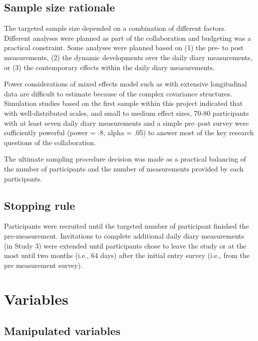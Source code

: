\documentclass[]{article}
\newcounter{question}
\begin{document}
\hypertarget{sample-size-rationale}{%
\subsection{Sample size rationale}\label{sample-size-rationale}}

The targeted sample size depended on a combination of different factors.
Different analyses were planned as part of the collaboration and
budgeting was a practical constraint. Some analyses were planned based
on (1) the pre- to post measurements, (2) the dynamic developments over
the daily diary measurements, or (3) the contemporary effects within the
daily diary measurements.

Power considerations of mixed effects model such as with extensive
longitudinal data are difficult to estimate because of the complex
covariance structures. Simulation studies based on the first sample
within this project indicated that with well-distributed scales, and
small to medium effect sizes, 70-80 participants with at least seven
daily diary measurements and a simple pre--post survey were sufficiently
powerful (power = .8, alpha = .05) to answer most of the key research
questions of the collaboration.

The ultimate sampling procedure decision was made as a practical
balancing of the number of participants and the number of measurements
provided by each participants.

\hypertarget{stopping-rule}{%
\subsection{Stopping rule}\label{stopping-rule}}

Participants were recruited until the targeted number of participant
finished the pre-measurement. Invitations to complete additional daily
diary measurements (in Study 3) were extended until participants chose
to leave the study or at the most until two months (i.e., 64 days) after
the initial entry survey (i.e., from the pre measurement survey).

\hypertarget{variables}{%
\section{Variables}\label{variables}}

\hypertarget{manipulated-variables}{%
\subsection{Manipulated variables}\label{manipulated-variables}}
\end{document}
